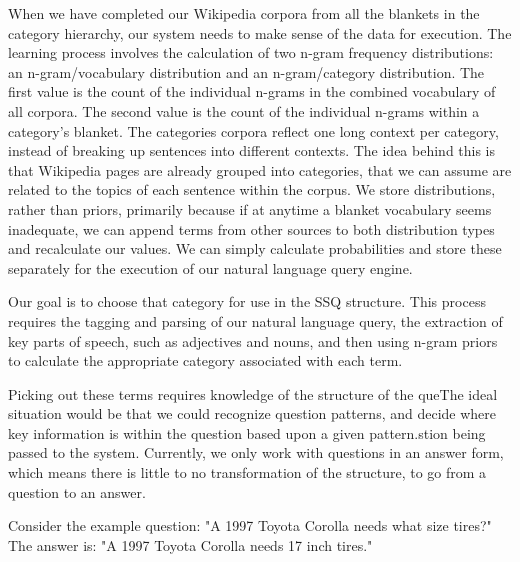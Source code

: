 
When we have completed our Wikipedia corpora from all the blankets in the category hierarchy, our system needs to make sense of the data for execution. The learning process involves the calculation of two n-gram frequency distributions: an n-gram/vocabulary distribution and an n-gram/category distribution. The first value is the count of the individual n-grams in the combined vocabulary of all corpora. The second value is the count of the individual n-grams within a category's blanket. The categories corpora reflect one long context per category, instead of breaking up sentences into different contexts. The idea behind this is that Wikipedia pages are already grouped into categories, that we can assume are related to the topics of each sentence within the corpus. We store distributions, rather than priors, primarily because if at anytime a blanket vocabulary seems inadequate, we can append terms from other sources to both distribution types and recalculate our values. We can simply calculate probabilities and store these separately for the execution of our natural language query engine. 

Our goal is to choose that category for use in the SSQ structure. This process requires the tagging and parsing of our natural language query, the extraction of key parts of speech, such as adjectives and nouns, and then using n-gram priors to calculate the appropriate category associated with each term. 

Picking out these terms requires knowledge of the structure of the queThe ideal situation would be that we could recognize question patterns, and decide where key information is within the question based upon a given pattern.stion being passed to the system.  Currently, we only work with questions in an answer form, which means there is little to no transformation of the structure, to go from a question to an answer.

Consider the example question: "A 1997 Toyota Corolla needs what size tires?" The answer is: "A 1997 Toyota Corolla needs 17 inch tires."
